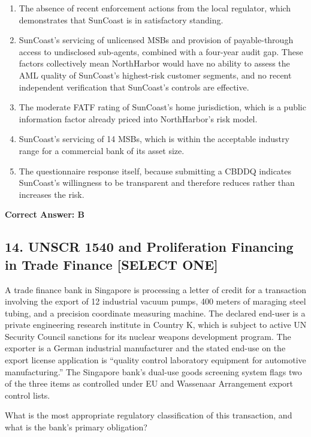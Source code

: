 \documentclass[11pt,a4paper]{article}
\begin{document}
	\begin{enumerate}[label=\Alph*.]
		\item The absence of recent enforcement actions from the local regulator, which demonstrates that SunCoast is in satisfactory standing.
		\item SunCoast's servicing of unlicensed MSBs and provision of payable-through access to undisclosed sub-agents, combined with a four-year audit gap. These factors collectively mean NorthHarbor would have no ability to assess the AML quality of SunCoast's highest-risk customer segments, and no recent independent verification that SunCoast's controls are effective.
		\item The moderate FATF rating of SunCoast's home jurisdiction, which is a public information factor already priced into NorthHarbor's risk model.
		\item SunCoast's servicing of 14 MSBs, which is within the acceptable industry range for a commercial bank of its asset size.
		\item The questionnaire response itself, because submitting a CBDDQ indicates SunCoast's willingness to be transparent and therefore reduces rather than increases the risk.
	\end{enumerate}
	\textbf{Correct Answer: B}
	
	\subsection{14. UNSCR 1540 and Proliferation Financing in Trade Finance \textnormal{[SELECT ONE]}}
	
	A trade finance bank in Singapore is processing a letter of credit for a transaction involving the export of 12 industrial vacuum pumps, 400 meters of maraging steel tubing, and a precision coordinate measuring machine. The declared end-user is a private engineering research institute in Country K, which is subject to active UN Security Council sanctions for its nuclear weapons development program. The exporter is a German industrial manufacturer and the stated end-use on the export license application is ``quality control laboratory equipment for automotive manufacturing.'' The Singapore bank's dual-use goods screening system flags two of the three items as controlled under EU and Wassenaar Arrangement export control lists.
	
	What is the most appropriate regulatory classification of this transaction, and what is the bank's primary obligation?
	
\end{document}
